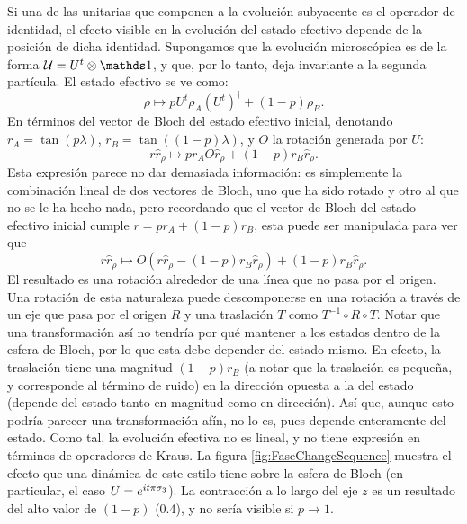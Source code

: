 Si una de las unitarias que componen a la evolución subyacente es el operador de identidad, el efecto visible en la evolución del estado efectivo depende de la posición de dicha identidad. Supongamos que la evolución microscópica es de la forma $\mcU=U^{t}\otimes\Id$, y que, por lo tanto, deja invariante a la segunda partícula. El estado efectivo se ve como:
\begin{equation}
    \rho\mapsto pU^{t}\rho_{A}(U^{t})^{\dag}+(1-p)\rho_{B}.
\end{equation}
En términos del vector de Bloch del estado efectivo inicial, denotando $r_{A}=\tan(p\lambda)$, $r_{B}=\tan((1-p)\lambda)$, y $O$ la rotación generada por $U$:
\begin{equation*}
    r\hat{r}_{\rho}\mapsto pr_{A}O\hat{r}_{\rho}+(1-p)r_{B}\hat{r}_{\rho}.
\end{equation*}
Esta expresión parece no dar demasiada información: es simplemente la combinación lineal de dos vectores de Bloch, uno que ha sido rotado y otro al que no se le ha hecho nada, pero recordando que el vector de Bloch del estado efectivo inicial cumple $r=pr_{A}+(1-p)r_{B}$, esta puede ser manipulada para ver que
\begin{equation*}
    r\hat{r}_{\rho}\mapsto O(r\hat{r}_{\rho}-(1-p)r_{B}\hat{r}_{\rho})+(1-p)r_{B}\hat{r}_{\rho}.
\end{equation*}
El resultado es una rotación alrededor de una línea que no pasa por el origen. Una rotación de esta naturaleza puede descomponerse en una rotación a través de un eje que pasa por el origen $R$ y una traslación $T$ como $T^{-1}\circ R\circ T$. Notar que una transformación así no tendría por qué mantener a los estados dentro de la esfera de Bloch, por lo que esta debe depender del estado mismo. En efecto, la traslación tiene una magnitud $(1-p)r_{B}$ (a notar que la traslación es pequeña, y corresponde al término de ruido) en la dirección opuesta a la del estado (depende del estado tanto en magnitud como en dirección). Así que, aunque esto podría parecer una transformación afín, no lo es, pues depende enteramente del estado. Como tal, la evolución efectiva no es lineal, y no tiene expresión en términos de operadores de Kraus. La figura \ref{fig:FaseChangeSequence} muestra el efecto que una dinámica de este estilo tiene sobre la esfera de Bloch (en particular, el caso $U=e^{it\pi \sigma_{3}}$). La contracción a lo largo del eje $z$ es un resultado del alto valor de $(1-p)$ (0.4), y no sería visible si $p\rightarrow 1$.

